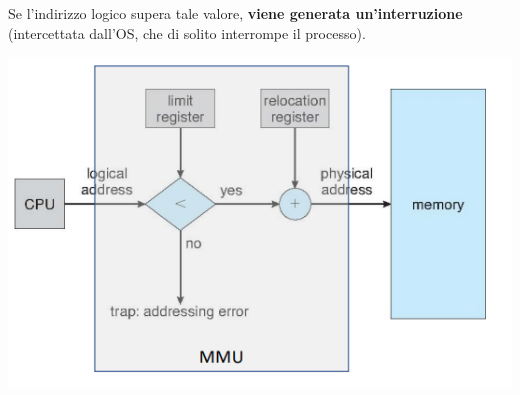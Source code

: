 \documentclass[12pt]{article}
\begin{document}
Se l'indirizzo logico supera tale valore, \textbf{viene generata un'interruzione} (intercettata dall'OS, che di solito interrompe il processo).
\begin{center}
    \includegraphics[width = 0.70\linewidth]{Images/57.png}
\end{center}
\end{document}
